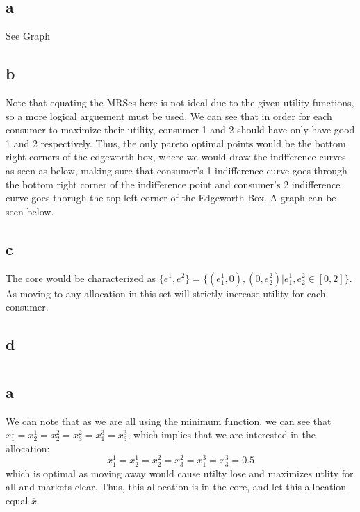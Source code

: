 \documentclass[11pt]{article}
\begin{document}
\subsection*{a}
See Graph
\subsection*{b}
Note that equating the MRSes here is not ideal due to the given utility functions, so a more logical arguement must be used. We can see that in order for each consumer to maximize their utility, consumer 1 and 2 should have only have good 1 and 2 respectively. Thus, the only pareto optimal points would be the bottom right corners of the edgeworth box, where we would draw the indfference curves as seen as below, making sure that consumer's 1 indifference curve goes through the bottom right corner of the indifference point and consumer's 2 indifference curve goes thorugh the top left corner of the Edgeworth Box. A graph can be seen below. 
\subsection*{c}
The core would be characterized as $\{e^1, e^2\} = \{(e_1^1, 0), (0, e_2^2) | e_1^1, e_2^2 \in [0,2]\}$. As moving to any allocation in this set will strictly increase utility for each consumer. 
\subsection*{d}
\section{}
\subsection*{a}
We can note that as we are all using the minimum function, we can see that $x_1^1 = x_2^1 = x_2^2 = x_3^2 = x_1^3 = x_3^3$, which implies that we are interested in the allocation:
\[
    x_1^1 = x_2^1 = x_2^2 = x_3^2 = x_1^3 = x_3^3 = 0.5
\]
which is optimal as moving away would cause utilty lose and maximizes utlity for all and markets clear. Thus, this allocation is in the core, and let this allocation equal $\overline{x}$
\end{document}
